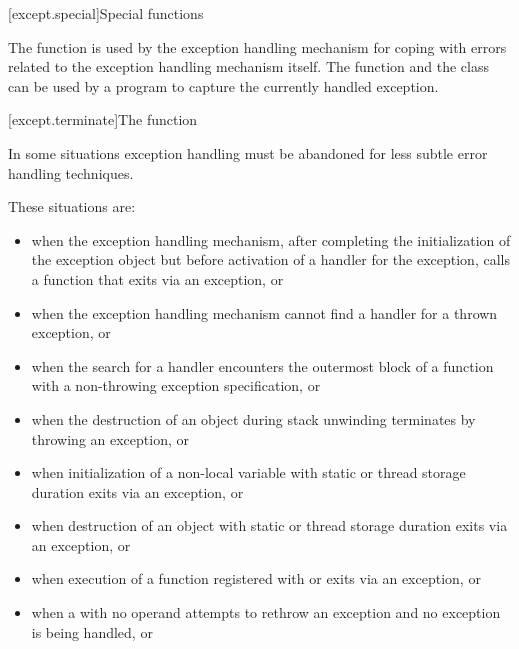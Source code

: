 [except.special]{Special functions}

\pnum
The function 
is used by the exception
handling mechanism for coping with errors related to the exception handling
mechanism itself. The function
 and the class
 can be used by a program to
capture the currently handled exception.

[except.terminate]{The  function}

\pnum
{}%
In some situations exception handling must be abandoned
for less subtle error handling techniques. \begin{note} These situations are:

%
\begin{itemize}
\item%
when the exception handling mechanism, after completing
the initialization of the exception object
but before
activation of a handler for the exception,
calls a function that exits
via an exception, or

\item%
when the exception handling mechanism cannot find a handler for a thrown exception, or

\item when the search for a handler encounters the
outermost block of a function
with a non-throwing exception specification, or

\item%
when the destruction of an object during stack unwinding
terminates by throwing an exception, or

\item%
when initialization of a non-local
variable with static or thread storage duration
exits via an exception, or

\item%
when destruction of an object with static or thread storage duration exits
via an exception, or

\item%
when execution of a function registered with
 or 
exits via an exception, or

\item%
when a
with no operand attempts to rethrow an exception and no exception is being
handled, or


\end{itemize}
\end{note}
